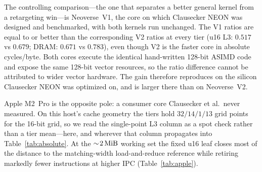 \documentclass[fleqn,10pt]{wlscirep}
\begin{document}
The controlling comparison---the one that separates a better general kernel from a retargeting win---is Neoverse~V1, the core on which Clausecker NEON was designed and benchmarked, with both kernels run unchanged. The V1 ratios are equal to or better than the corresponding V2 ratios at every tier (u16 L3: $0.517$ vs $0.679$; DRAM: $0.671$ vs $0.783$), even though V2 is the faster core in absolute cycles/byte. Both cores execute the identical hand-written 128-bit ASIMD code and expose the same 128-bit vector resources, so the ratio difference cannot be attributed to wider vector hardware. The gain therefore reproduces on the silicon Clausecker NEON was optimized on, and is larger there than on Neoverse~V2.

Apple M2~Pro is the opposite pole: a consumer core Clausecker et al.\ never measured. On this host's cache geometry the tiers hold $32/14/1/13$ grid points for the 16-bit grid, so we read the single-point L3 column as a spot check rather than a tier mean---here, and wherever that column propagates into Table~\ref{tab:absolute}. At the $\sim\!\SI{2}{\mebi\byte}$ working set the fixed u16 leaf closes most of the distance to the matching-width load-and-reduce reference while retiring markedly fewer instructions at higher IPC (Table~\ref{tab:apple}).
\end{document}
